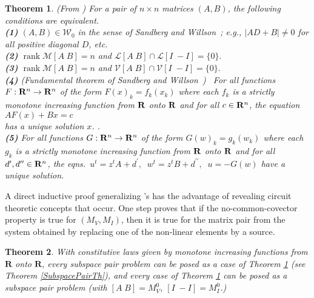 \documentclass{article}
\def\Reals{\ensuremath{\mathbf R}}
\newtheorem{theorem}{Theorem}
\DeclareMathOperator{\rank}{rank}
\newcommand{\hmat}[2]{[#1\;#2]}
\begin{document}
\begin{theorem}
\label{sandwillompairtheorem}
(From \cite{sdcOMP}) For a pair 
%
%
of $n\times n$ 
matrices $(A,B)$, the following conditions are 
equivalent.\\
%
%
\textbf{(1)}
$(A,B)\in {\mathcal W}_0$ in the sense of 
Sandberg and 
Willson~\cite{SWExistancePf};
e.g., $|AD+B|\neq 0$ for all positive diagonal $D$, etc.\\
\textbf{(2)}
$\rank{\mathcal M}\hmat{A}{B}=n$ and 
${\mathcal L}\hmat{A}{B} \cap {\mathcal L}\hmat{I}{-I}=\{0\}.$\\
\textbf{(3)}
$\rank{\mathcal M}\hmat{A}{B}=n$ and 
${\mathcal V}\hmat{A}{B} \cap {\mathcal V}\hmat{I}{-I}=\{0\}.$\\
\textbf{(4)}
\textrm{(}Fundamental theorem of Sandberg and 
Willson~\cite{SWExistancePf,W0APPLpaper}\textrm{)}\ 
%
%
For all functions $F:{\bf R}^n\rightarrow {\bf R}^n$ of the form
$F(x)_k=f_k(x_k)$ where each $f_k$ is a strictly 
monotone increasing 
function from 
${\bf R}$ {\em onto} $\bf R$ and for all $c\in {\bf R}^n$, the 
equation $AF(x) + Bx = c$\\
has a unique solution $x$. \cite{W0APPLpaper}.\\
\textbf{(5)}
For all functions $G:{\bf R}^n\rightarrow {\bf R}^n$ of the form
$G(w)_k=g_k(w_k)$ where each $g_k$ is a strictly monotone increasing 
function from ${\bf R}$ {\em onto} $\bf R$ and for all 
$d^{\prime}, d^{\prime\prime}\in {\bf R}^n$, the 
eqns.\ $u^t=z^tA+d^{\prime},\;\; w^t=z^tB+d^{\prime\prime},\;\; u=-G(w)$
have a unique solution.%
\end{theorem}

A direct inductive proof generalizing 
\cite{HaslerNeirynck,Fosseprez}'s has the advantage
of revealing circuit theoretic concepts that occur.
One step proves that if the no-common-covector
property is true for $(M_V,M_I)$, then it is true for the matrix pair 
from the system obtained by replacing one of the non-linear elements by a
source.

\begin{theorem}
\label{PairConclusionTheorem}
With constitutive laws given by monotone increasing functions from 
$\Reals$ onto
$\Reals$, every subspace pair problem can be posed as a case of Theorem
\ref{sandwillompairtheorem} (see Theorem \ref{SubspacePairTh}), 
and every case of Theorem
\ref{sandwillompairtheorem} can be posed as a subspace pair problem
(with $\hmat{A}{B}=M_V^0$, $\hmat{I}{-I}=M_I^0$.)
\end{theorem}
\end{document}
